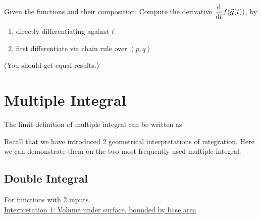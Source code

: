 \documentclass[class=article, crop=false, 12pt]{standalone}
\begin{document}
\begin{exercise}
    Given the functions and their composition: 
    Compute the derivative $\dvv{t}f(\vvec{g}(t))$, by
    \begin{enumerate}
        \item directly differentiating against $t$
        \item first differentiate via chain rule over $(p,q)$
    \end{enumerate}
    (You should get equal results.)
\end{exercise}



\linesep
\section{Multiple Integral}

The limit definition of multiple integral can be written as


Recall that we have introduced 2 geometrical interpretations of integration.
Here we can demonstrate them on the two most frequently used multiple integral.

\subsection{Double Integral}

For functions with 2 inputs.\\

\ul{Interpretation 1: Volume under surface, bounded by base area}

\\
\end{document}
